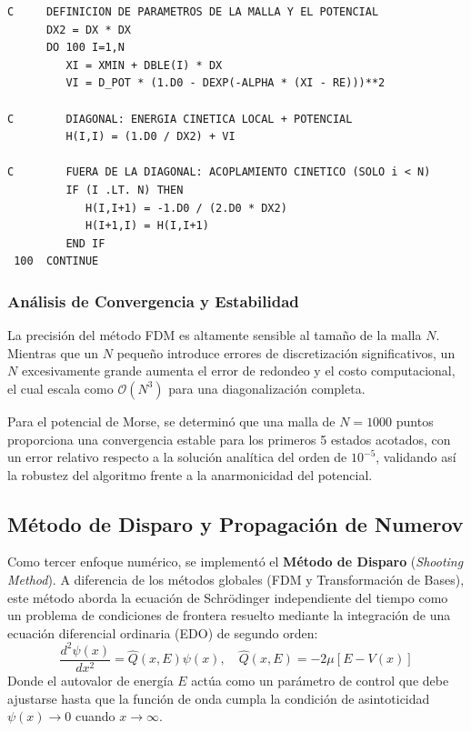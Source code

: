 \documentclass[11pt,fleqn]{article}
\begin{document}
\begin{lstlisting}[caption=Ensamblaje de la matriz Hamiltoniana tridiagonal en Fortran 77]
C     DEFINICION DE PARAMETROS DE LA MALLA Y EL POTENCIAL
      DX2 = DX * DX
      DO 100 I=1,N
         XI = XMIN + DBLE(I) * DX
         VI = D_POT * (1.D0 - DEXP(-ALPHA * (XI - RE)))**2
         
C        DIAGONAL: ENERGIA CINETICA LOCAL + POTENCIAL
         H(I,I) = (1.D0 / DX2) + VI
         
C        FUERA DE LA DIAGONAL: ACOPLAMIENTO CINETICO (SOLO i < N)
         IF (I .LT. N) THEN
            H(I,I+1) = -1.D0 / (2.D0 * DX2)
            H(I+1,I) = H(I,I+1)
         END IF
 100  CONTINUE
\end{lstlisting}

\subsubsection{Análisis de Convergencia y Estabilidad}

La precisión del método FDM es altamente sensible al tamaño de la malla $N$. Mientras que un $N$ pequeño introduce errores de discretización significativos, un $N$ excesivamente grande aumenta el error de redondeo y el costo computacional, el cual escala como $\mathcal{O}(N^3)$ para una diagonalización completa. 



Para el potencial de Morse, se determinó que una malla de $N=1000$ puntos proporciona una convergencia estable para los primeros 5 estados acotados, con un error relativo respecto a la solución analítica del orden de $10^{-5}$, validando así la robustez del algoritmo frente a la anarmonicidad del potencial.





\subsection{Método de Disparo y Propagación de Numerov}

Como tercer enfoque numérico, se implementó el \textbf{Método de Disparo} (\textit{Shooting Method}). A diferencia de los métodos globales (FDM y Transformación de Bases), este método aborda la ecuación de Schrödinger independiente del tiempo como un problema de condiciones de frontera resuelto mediante la integración de una ecuación diferencial ordinaria (EDO) de segundo orden:
\begin{equation}
    \frac{d^2\psi(x)}{dx^2} = \hat{Q}(x, E)\psi(x), \quad \hat{Q}(x, E) = -2\mu [E - V(x)]
\end{equation}
Donde el autovalor de energía $E$ actúa como un parámetro de control que debe ajustarse hasta que la función de onda cumpla la condición de asintoticidad $\psi(x) \to 0$ cuando $x \to \infty$.
\end{document}
